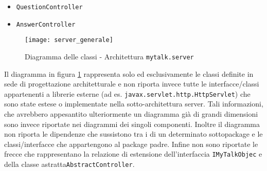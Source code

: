 \begin{itemize}[noitemsep,nolistsep]
\item \texttt{QuestionController}

\item \texttt{AnswerController}

\end {itemize}

\begin{figure}[H]
  \centering
  \texttt{[image: server\_generale]}
  \caption{Diagramma delle classi - Architettura \texttt{mytalk.server}}\label{fig:sottoarchserver}
\end{figure}

Il diagramma in figura \ref{fig:sottoarchserver} rappresenta solo ed esclusivamente le classi definite in sede di progettazione architetturale e non riporta invece tutte le interfacce/classi appartenenti a librerie esterne (ad es. \texttt{javax.servlet.http.HttpServlet}) che sono state estese o implementate nella sotto-architettura server. Tali informazioni, che avrebbero appesantito ulteriormente un diagramma già di grandi dimensioni sono invece riportate nei diagrammi dei singoli componenti.
Inoltre il diagramma non riporta le dipendenze che sussistono tra i  di un determinato sottopackage e le classi/interfacce che appartengono al package padre.
Infine non sono riportate le frecce che rappresentano la relazione di estensione dell'interfaccia \texttt{IMyTalkObjec} e della classe astratta\texttt{AbstractController}.
\clearpage

